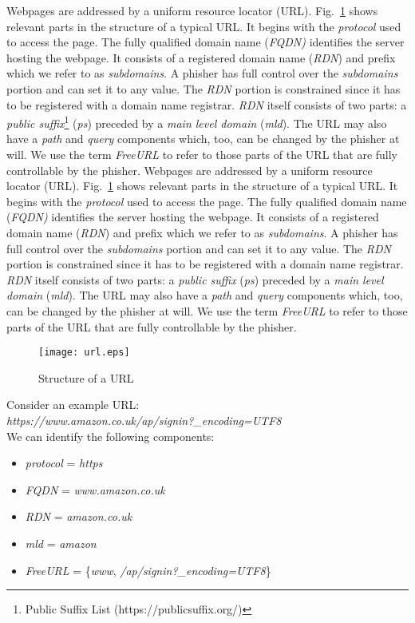 \documentclass[10pt,conference,compsocconf,letterpaper]{IEEEtran}
\begin{document}
\iffeateval
Webpages are addressed by a uniform resource locator (URL).
Fig.~\ref{fig:url} shows relevant parts in the structure of a typical URL. It begins with the \textit{protocol} used to access the page. The fully qualified domain name (\textit{FQDN)} identifies the server hosting the webpage. It consists of a registered domain name (\textit{RDN}) and prefix which we refer to as \textit{subdomains}. A phisher has full control over the \textit{subdomains} portion and can set it to any value. The \textit{RDN} portion is constrained since it has to be registered with a domain name registrar. \textit{RDN} itself consists of two parts: a \textit{public suffix}\footnote{Public Suffix List (https://publicsuffix.org/)} (\textit{ps}) preceded by a \textit{main level domain} (\textit{mld}). The URL may also have a \textit{path} and \textit{query} components which, too, can be changed by the phisher at will. We use the term \textit{FreeURL} to refer to those parts of the URL that are fully controllable by the phisher.
\else
Webpages are addressed by a uniform resource locator (URL).
Fig.~\ref{fig:url} shows relevant parts in the structure of a typical URL. It begins with the \textit{protocol} used to access the page. The fully qualified domain name (\textit{FQDN)} identifies the server hosting the webpage. It consists of a registered domain name (\textit{RDN}) and prefix which we refer to as \textit{subdomains}. A phisher has full control over the \textit{subdomains} portion and can set it to any value. The \textit{RDN} portion is constrained since it has to be registered with a domain name registrar. \textit{RDN} itself consists of two parts: a \textit{public suffix} (\textit{ps}) preceded by a \textit{main level domain} (\textit{mld}). The URL may also have a \textit{path} and \textit{query} components which, too, can be changed by the phisher at will. We use the term \textit{FreeURL} to refer to those parts of the URL that are fully controllable by the phisher.
\fi


\begin{figure}[htpb]
        \centering
        \texttt{[image: url.eps]}
        \caption{Structure of a URL}\label{fig:url}
\end{figure}


Consider an example URL:\\
\textit{https://www.amazon.co.uk/ap/signin?\_encoding=UTF8}\\
We can identify the following components:
\begin{itemize}
\item \emph{protocol} = \textit{https}
\item \emph{FQDN} = \textit{www.amazon.co.uk}
\item \emph{RDN} = \textit{amazon.co.uk}
\item \emph{mld} = \textit{amazon}
\item \emph{FreeURL} = \{\textit{www}, \textit{/ap/signin?\_encoding=UTF8}\}
\end{itemize} 
\end{document}
